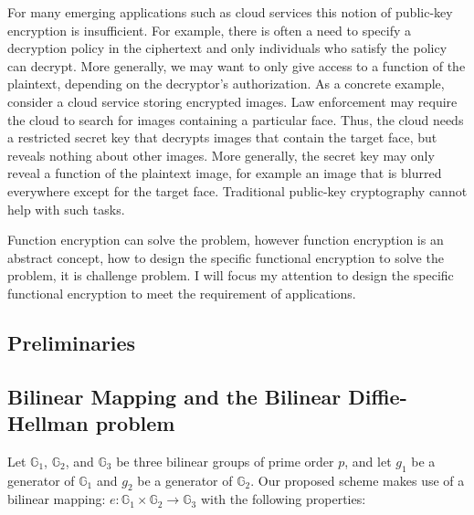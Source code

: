 \documentclass[letterpaper,12pt]{article}
\begin{document}
For many emerging applications such as cloud services this notion of public-key encryption is insufficient. For example, there is often a need to specify a decryption policy in the ciphertext and only individuals who satisfy the policy can decrypt. More generally, we may want to only give access to a function of the plaintext, depending on the decryptor's authorization. As a concrete example, consider a cloud service storing encrypted images. Law enforcement may require the cloud to search for images containing a particular face. Thus, the cloud needs a restricted secret key that decrypts images that contain the target face, but reveals nothing about other images. More generally, the secret key may only reveal a function of the plaintext image, for example an image that is blurred everywhere except for the target face. Traditional public-key cryptography cannot help with such tasks.

Function encryption can solve the problem, however function encryption is an abstract concept, how to design the specific functional encryption to solve the problem, it is challenge problem. I will focus my attention to design the specific functional encryption to meet the requirement of applications.
%


   \newpage
      \begin{singlespace}
           \section{Preliminaries}
      \end{singlespace}
   \label{preliminaries}
\subsection{Bilinear Mapping and the Bilinear Diffie-Hellman problem}

Let $\mathbb{G}_1$, $\mathbb{G}_2$, and $\mathbb{G}_3$ be three bilinear groups of prime order $p$, and let $g_1$ be a generator of $\mathbb{G}_1$ and $g_2$ be a generator of $\mathbb{G}_2$.  Our
proposed scheme makes use of a bilinear mapping: $e: \mathbb{G}_1\times \mathbb{G}_2\rightarrow \mathbb{G}_3$ with the following properties:
\end{document}
